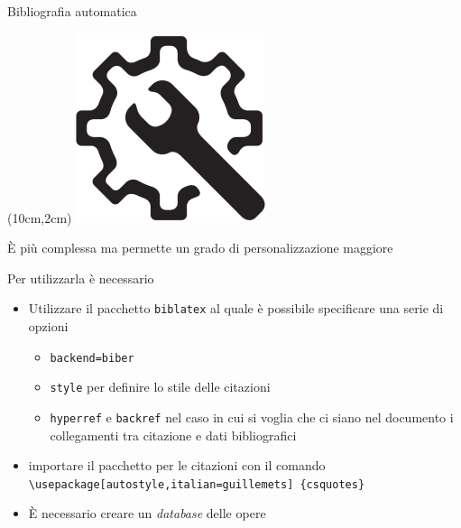 \begin{frame}{Bibliografia automatica}

\begin{textblock*}{2cm}(10cm,2cm)
      \includegraphics[scale=0.28]{res/images/automatic}
\end{textblock*}

È più complessa ma permette un grado di personalizzazione maggiore

\vfill

Per utilizzarla è necessario
\begin{itemize}
	\item Utilizzare il pacchetto \texttt{biblatex} al quale è possibile specificare una serie di opzioni
	\begin{itemize}
		\item \texttt{backend=biber}
		\item \texttt{style} per definire lo stile delle citazioni
		\item \texttt{hyperref} e \texttt{backref} nel caso in cui si voglia
		che ci siano nel documento i collegamenti tra citazione e dati
		bibliografici
	\end{itemize}
	\item importare il pacchetto per le citazioni con il comando 
	\texttt{\textbackslash{}usepackage[autostyle,italian=guillemets]
	\{csquotes\}}
	\item È necessario creare un \emph{database} delle opere
\end{itemize}

\end{frame}
